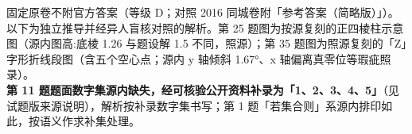 

\begin{gktip}
固定原卷不附官方答案（等级 D；对照 2016 同城卷附「参考答案（简略版）」）。以下为独立推导并经异人盲核对照的解析。第 25 题图为按源复刻的正四棱柱示意图（源内图高:底棱 1.26 与题设解 1.5 不同，照源）；第 35 题图为照源复刻的「Z」字形折线段图（含五个空心点；源内 y 轴倾斜 1.67°、x 轴偏离真零位等瑕疵照录）。\textbf{第 11 题题面数字集源内缺失，经可核验公开资料补录为「1、2、3、4、5」}（见试题版来源说明），解析按补录数字集书写；第 1 题「若集合则」系源内排印如此，按语义作求补集处理。
\end{gktip}

